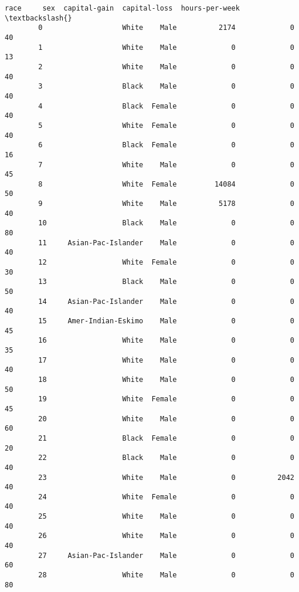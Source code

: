 \documentclass[11pt]{article}
\begin{document}
\begin{Verbatim}[commandchars=\\\{\}]
                             race     sex  capital-gain  capital-loss  hours-per-week  \textbackslash{}
        0                   White    Male          2174             0              40   
        1                   White    Male             0             0              13   
        2                   White    Male             0             0              40   
        3                   Black    Male             0             0              40   
        4                   Black  Female             0             0              40   
        5                   White  Female             0             0              40   
        6                   Black  Female             0             0              16   
        7                   White    Male             0             0              45   
        8                   White  Female         14084             0              50   
        9                   White    Male          5178             0              40   
        10                  Black    Male             0             0              80   
        11     Asian-Pac-Islander    Male             0             0              40   
        12                  White  Female             0             0              30   
        13                  Black    Male             0             0              50   
        14     Asian-Pac-Islander    Male             0             0              40   
        15     Amer-Indian-Eskimo    Male             0             0              45   
        16                  White    Male             0             0              35   
        17                  White    Male             0             0              40   
        18                  White    Male             0             0              50   
        19                  White  Female             0             0              45   
        20                  White    Male             0             0              60   
        21                  Black  Female             0             0              20   
        22                  Black    Male             0             0              40   
        23                  White    Male             0          2042              40   
        24                  White  Female             0             0              40   
        25                  White    Male             0             0              40   
        26                  White    Male             0             0              40   
        27     Asian-Pac-Islander    Male             0             0              60   
        28                  White    Male             0             0              80   

\end{Verbatim}
\end{document}
